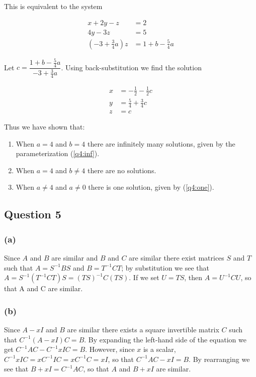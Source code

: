 \documentclass{article}
\begin{document}
This is equivalent to the system

\begin{align*}
 x + 2y - z &= 2 \\
 4y -3z &= 5 \\
 (-3 + \frac{3}{4}a)z &= 1 + b - \frac{5}{4}a
\end{align*}

Let $c = \dfrac{1 + b - \frac{5}{4}a}{-3 + \frac{3}{4}a}$.  Using back-substitution we find the solution

\begin{equation}\begin{aligned}
 x &= -\frac{1}{2} - \frac{1}{2}c \\
 y &= \frac{5}{4} + \frac{3}{4}c \\
 z &= c
\end{aligned}\label{q4:one}\end{equation}

Thus we have shown that:
\begin{enumerate}
\item When $a = 4$ and $b = 4$ there are infinitely many solutions, given
by the parameterization (\ref{q4:inf}).
\item When $a = 4$ and $b \neq 4$ there are no solutions.
\item When $a \neq 4$ and $a \neq 0$ there is one solution, given by 
(\ref{q4:one}).
\end{enumerate}

\subsection*{Question 5}

\subsubsection*{(a)}
Since $A$ and $B$ are similar and $B$ and $C$ are similar there exist
matrices $S$ and $T$ such that $A = S^{-1}BS$ and $B = T^{-1}CT$; by
substitution we see that $A = S^{-1}(T^{-1}CT)S = (TS)^{-1}C(TS)$.  If
we set $U = TS$, then $A = U^{-1}CU$, so that A and C are similar.

\subsubsection*{(b)}
Since $A - xI$ and $B$ are similar there exists a square invertible matrix
$C$ such that $C^{-1}(A - xI)C = B$.  By expanding the left-hand side of the
equation we get $C^{-1}AC - C^{-1}xIC = B$.  However, since $x$ is a scalar,
$C^{-1}xIC = xC^{-1}IC = xC^{-1}C = xI$, so that $C^{-1}AC - xI = B$.  By
rearranging we see that $B + xI = C^{-1}AC$, so that $A$ and $B + xI$ are
similar.
\end{document}
